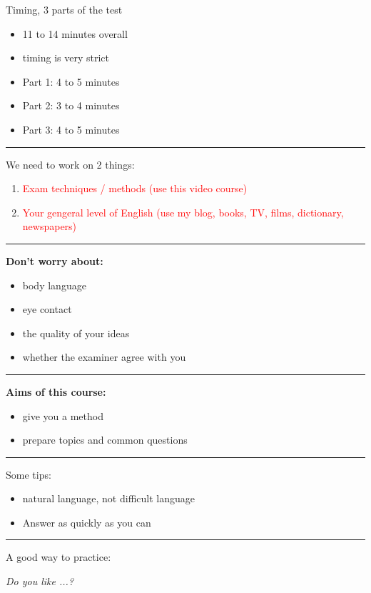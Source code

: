 \documentclass[12pt,a4paper]{article}
\newcommand{\textred}[1]{\textcolor{red}{#1}}  %
\begin{document}
Timing, 3 parts of the test

\begin{itemize}
    \item 11 to 14 minutes overall
    \item timing is very strict
    
    \item Part 1: 4 to 5 minutes
    \item Part 2: 3 to 4 minutes
    \item Part 3: 4 to 5 minutes
\end{itemize}
\rule{\linewidth}{1pt}


{\Large We need to work on 2 things: \par}

\begin{enumerate}
    \item \textred{Exam techniques / methods (use this video course)}
    \item \textred{Your gengeral level of English (use my blog, books, TV, films, dictionary, newspapers)}
\end{enumerate}

\rule{\linewidth}{1pt}
\textbf{Don't worry about:}
\begin{itemize}[leftmargin=*]
    \item body language
    \item eye contact
    \item the quality of your ideas
    \item whether the examiner agree with you
\end{itemize}

\rule{\linewidth}{1pt}
\textbf{Aims of this course:}
\begin{itemize}[leftmargin=*]
    \item give you a method
    \item prepare topics and common questions
\end{itemize}

\rule{\linewidth}{1pt}
Some tips:
\begin{itemize}
    \item natural language, not difficult language
    \item Answer as quickly as you can
\end{itemize}

\rule{\linewidth}{2pt}


A good way to practice:

\textit{ Do you like ...? }
\end{document}
